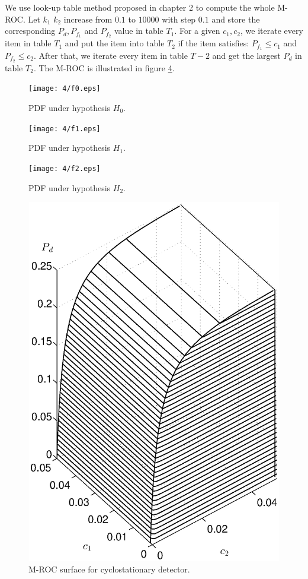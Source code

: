 We use look-up table method proposed in chapter 2 to compute the whole M-ROC.  Let $k_1$ $k_2$ increase from $0.1$ to $10000$ with step $0.1$ and store the corresponding $P_d, P_{f_1}$ and $P_{f_2}$ value in table $T_1$. For a given $c_1, c_2$, we iterate every item in table $T_1$ and put the item into table $T_2$ if the item satisfies: $P_{f_1} \leq c_1$ and $P_{f_2}\leq c_2$. After that, we iterate every item in table $T-2$ and get the largest $P_d$ in table $T_2$. The M-ROC is illustrated in figure \ref{pic:1221n0}.  

\begin{figure}[!t]
  \centering 
  \texttt{[image: 4/f0.eps]}
  \caption{PDF under hypothesis $H_0$.}
  \label{pic:1218n0}
\end{figure}
\begin{figure}[!t]
  \centering 
  \texttt{[image: 4/f1.eps]}
  \caption{PDF under hypothesis $H_1$.}
  \label{pic:1218n1}
\end{figure}
\begin{figure}[!t]
  \centering 
  \texttt{[image: 4/f2.eps]}
  \caption{PDF under hypothesis $H_2$.}
  \label{pic:1218n2}
\end{figure}

\begin{figure}[!t]
  \centering 
  \includegraphics[width=12cm, height=16cm]{4/ROCsurface.eps}
  \caption{M-ROC surface for cyclostationary detector.}
  \label{pic:1221n0}
\end{figure}
